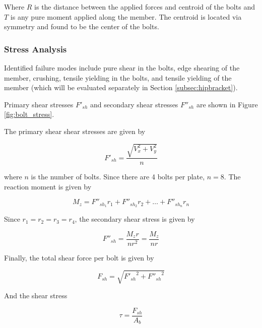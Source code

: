 Where $R$ is the distance between the applied forces and centroid of the bolts and $T$ is any pure moment applied along the member.
The centroid is located via symmetry and found to be the center of the bolts.


\subsubsection{Stress Analysis}

Identified failure modes include pure shear in the bolts, edge shearing of the member, crushing, tensile yielding in the bolts, and tensile yielding of the member (which will be evaluated separately in Section \ref{subsec:hipbracket}).


Primary shear stresses $F'_{sh}$ and secondary shear stresses $F''_{sh}$ are shown in Figure \ref{fig:bolt_stress}.

The primary shear shear stresses are given by

\begin{equation} \label{eq:bolt_shear_force_1}
    F'_{sh}= \frac{ \sqrt{V_x^2 + V_y^2} }{n}
\end{equation}

where $n$ is the number of bolts.
Since there are 4 bolts per plate, $n=8$.
The reaction moment is given by

\begin{equation}
    M_z = F''_{sh_1} r_1 + F''_{sh_2} r_2 + \dots +  F''_{sh_n} r_n
\end{equation}

Since $r_1 = r_2 = r_3 = r_4$, the secondary shear stress is given by \cite{budynas_shigleys_2015}

\begin{equation}{} \label{eq:bolt_shear_force_2}
    F''_{sh} = \frac{M_z r}{nr^2} = \frac{M_z}{nr}
\end{equation}

Finally, the total shear force per bolt is given by

\begin{equation} \label{eq:bolt_shear_force_total}
    F_{sh} = \sqrt{{F'_{sh}}^{2} + {F''_{sh}}^{2}}
\end{equation}

And the shear stress

\begin{equation} \label{eq:bolt_shear_stress}
    \tau = \frac{F_{sh}}{A_b}
\end{equation}{}

